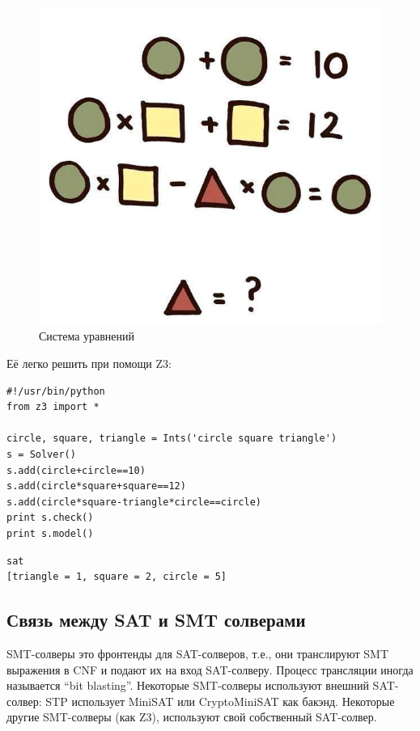 \begin{figure}[H]
\centering
\includegraphics[scale=0.3]{SMT/equation.jpg}
\caption{Система уравнений}
\end{figure}

Её легко решить при помощи Z3:

\begin{lstlisting}
#!/usr/bin/python
from z3 import *

circle, square, triangle = Ints('circle square triangle')
s = Solver()
s.add(circle+circle==10)
s.add(circle*square+square==12)
s.add(circle*square-triangle*circle==circle)
print s.check()
print s.model()
\end{lstlisting}

\begin{lstlisting}
sat
[triangle = 1, square = 2, circle = 5]
\end{lstlisting}

\subsection{Связь между \ac{SAT} и \ac{SMT} солверами}

\ac{SMT}-солверы это фронтенды для \ac{SAT}-солверов, т.е.,
они транслируют SMT выражения в \ac{CNF} и подают их на вход SAT-солверу.
Процесс трансляции иногда называется ``bit blasting''.
Некоторые \ac{SMT}-солверы используют внешний SAT-солвер: STP использует MiniSAT или CryptoMiniSAT как бакэнд.
Некоторые другие \ac{SMT}-солверы (как Z3), используют свой собственный SAT-солвер.

